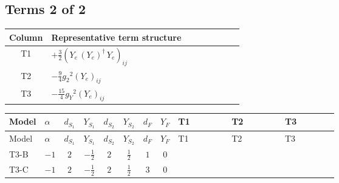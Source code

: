\documentclass[8pt]{article}
\begin{document}
\begin{landscape}
\subsection*{Terms 2 of 2}
\begin{center}
\begin{tabular}{@{}c >{\raggedright\arraybackslash}p{0.82\linewidth}@{}}
\toprule
Column & Representative term structure \\
\midrule
T1 & \(\displaystyle +\frac{3}{2} \left({Y_e}\,\left({Y_e}\right)^{\dagger}\,{Y_e}\right)_{ij}\) \\
\midrule
T2 & \(\displaystyle -\frac{9}{4} {g_2}^2 \left({Y_e}\right)_{ij}\) \\
\midrule
T3 & \(\displaystyle -\frac{15}{4} {g_Y}^2 \left({Y_e}\right)_{ij}\) \\
\midrule
\bottomrule
\end{tabular}
\end{center}
\smallskip
\tiny
\begin{longtable}{@{}llcccccc >{\raggedright\arraybackslash}p{0.21\linewidth} >{\raggedright\arraybackslash}p{0.21\linewidth} >{\raggedright\arraybackslash}p{0.21\linewidth}@{}}
\toprule
Model & $\alpha$ & $d_{S_1}$ & $Y_{S_1}$ & $d_{S_2}$ & $Y_{S_2}$ & $d_F$ & $Y_F$ & T1 & T2 & T3 \\
\midrule
\endfirsthead
\toprule
Model & $\alpha$ & $d_{S_1}$ & $Y_{S_1}$ & $d_{S_2}$ & $Y_{S_2}$ & $d_F$ & $Y_F$ & T1 & T2 & T3 \\
\midrule
\endhead
T3-B & $-1$ & $2$ & $-\frac{1}{2}$ & $2$ & $\frac{1}{2}$ & $1$ & $0$ & \scriptsize\adjustbox{max width=\linewidth}{$\begin{gathered} +\frac{3}{2} \left({Y_e}\,\left({Y_e}\right)^{\dagger}\,{Y_e}\right)_{ij}\end{gathered}$} & \scriptsize\adjustbox{max width=\linewidth}{$\begin{gathered} -\frac{9}{4} {g_2}^2 \left({Y_e}\right)_{ij}\end{gathered}$} & \scriptsize\adjustbox{max width=\linewidth}{$\begin{gathered} -\frac{15}{4} {g_Y}^2 \left({Y_e}\right)_{ij}\end{gathered}$} \\
\midrule
T3-C & $-1$ & $2$ & $-\frac{1}{2}$ & $2$ & $\frac{1}{2}$ & $3$ & $0$ & \scriptsize\adjustbox{max width=\linewidth}{$\begin{gathered} +\frac{3}{2} \left({Y_e}\,\left({Y_e}\right)^{\dagger}\,{Y_e}\right)_{ij}\end{gathered}$} & \scriptsize\adjustbox{max width=\linewidth}{$\begin{gathered} -\frac{9}{4} {g_2}^2 \left({Y_e}\right)_{ij}\end{gathered}$} & \scriptsize\adjustbox{max width=\linewidth}{$\begin{gathered} -\frac{15}{4} {g_Y}^2 \left({Y_e}\right)_{ij}\end{gathered}$} \\

\end{longtable}
\end{landscape}
\end{document}
